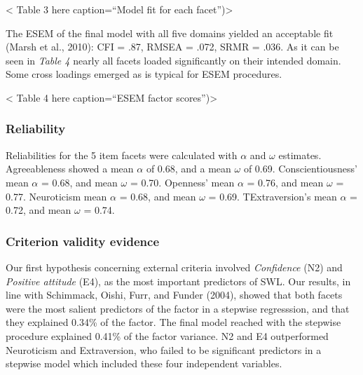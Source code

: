 \documentclass[,man,floatsintext]{apa6}
\begin{document}
\vspace{5mm}

\textless{} Table 3 here caption=\enquote{Model fit for each
facet})\textgreater{}

\vspace{5mm}

The ESEM of the final model with all five domains yielded an acceptable
fit (Marsh et al., 2010): CFI = .87, RMSEA = .072, SRMR = .036. As it
can be seen in \emph{Table 4} nearly all facets loaded significantly on
their intended domain. Some cross loadings emerged as is typical for
ESEM procedures.

\vspace{5mm}

\textless{} Table 4 here caption=\enquote{ESEM factor
scores})\textgreater{}

\vspace{5mm}

\subsubsection{Reliability}\label{reliability-1}

Reliabilities for the 5 item facets were calculated with \(\alpha\) and
\(\omega\) estimates. Agreeableness showed a mean \(\alpha\) of 0.68,
and a mean \(\omega\) of 0.69. Conscientiousness' mean \(\alpha\) =
0.68, and mean \(\omega\) = 0.70. Openness' mean \(\alpha\) = 0.76, and
mean \(\omega\) = 0.77. Neuroticism mean \(\alpha\) = 0.68, and mean
\(\omega\) = 0.69. TExtraversion's mean \(\alpha\) = 0.72, and mean
\(\omega\) = 0.74.

\subsubsection{Criterion validity
evidence}\label{criterion-validity-evidence-1}

Our first hypothesis concerning external criteria involved
\emph{Confidence} (N2) and \emph{Positive attitude} (E4), as the most
important predictors of SWL. Our results, in line with Schimmack, Oishi,
Furr, and Funder (2004), showed that both facets were the most salient
predictors of the factor in a stepwise regresssion, and that they
explained 0.34\% of the factor. The final model reached with the
stepwise procedure explained 0.41\% of the factor variance. N2 and E4
outperformed Neuroticism and Extraversion, who failed to be significant
predictors in a stepwise model which included these four independent
variables.
\end{document}
